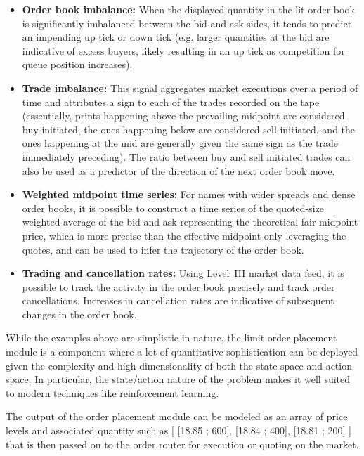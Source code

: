 \begin{itemize}
\item \textbf{Order book imbalance:} When the displayed quantity in the lit order book is significantly imbalanced between the bid and ask sides, it tends to predict an impending up tick or down tick (e.g. larger quantities at the bid are indicative of excess buyers, likely resulting in an up tick as competition for queue position increases).

\item \textbf{Trade imbalance:} This signal aggregates market executions over a period of time and attributes a sign to each of the trades recorded on the tape (essentially, prints happening above the prevailing midpoint are considered buy-initiated, the ones happening below are considered sell-initiated, and the ones happening at the mid are generally given the same sign as the trade immediately preceding). The ratio between buy and sell initiated trades can also be used as a predictor of the direction of the next order book move.

\item \textbf{Weighted midpoint time series:} For names with wider spreads and dense order books, it is possible to construct a time series of the quoted-size weighted average of the bid and ask representing the theoretical fair midpoint price, which is more precise than the effective midpoint only leveraging the quotes, and can be used to infer the trajectory of the order book.

\item \textbf{Trading and cancellation rates:} Using Level~III market data feed, it is possible to track the activity in the order book precisely and track order cancellations. Increases in cancellation rates are indicative of subsequent changes in the order book. 
\end{itemize}


While the examples above are simplistic in nature, the limit order placement module is a component where a lot of quantitative sophistication can be deployed given the complexity and high dimensionality of both the state space and action space. In particular, the state/action nature of the problem makes it well suited to modern techniques like reinforcement learning. 


The output of the order placement module can be modeled as an array of price levels and associated quantity such as [ [18.85 ; 600], [18.84 ; 400], [18.81 ; 200] ] that is then passed on to the order router for execution or quoting on the market.



